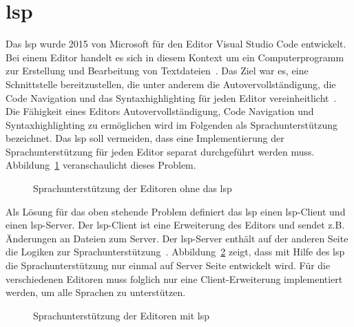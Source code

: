 \section{\acs{lsp}}

Das \ac{lsp} wurde 2015 von Microsoft für den Editor Visual Studio Code entwickelt.
Bei einem Editor handelt es sich in diesem Kontext um ein Computerprogramm zur Erstellung und Bearbeitung von Textdateien~\cite{editor-definition}.
Das Ziel war es, eine Schnittstelle bereitzustellen, die unter anderem die Autovervollständigung, die Code Navigation und das Syntaxhighlighting
für jeden Editor vereinheitlicht~\cite{lsp-witekio}.
Die Fähigkeit eines Editors Autovervollständigung, Code Navigation und Syntaxhighlighting zu ermöglichen wird im Folgenden als Sprachunterstützung bezeichnet.
Das \ac{lsp} soll vermeiden, dass eine Implementierung der Sprachunterstützung für jeden Editor separat durchgeführt werden muss.
Abbildung~\ref{fig:without-lsp} veranschaulicht dieses Problem.

\begin{figure}[htp] %
      \centering
      \caption{Sprachunterstützung der Editoren ohne das \acs{lsp}}
      \label{fig:without-lsp}
\end{figure}

Als Lösung für das oben stehende Problem definiert das \ac{lsp} einen \ac{lsp}-Client und einen \ac{lsp}-Server.
Der \ac{lsp}-Client ist eine Erweiterung des Editors und sendet z.B. Änderungen an Dateien zum Server.
Der \ac{lsp}-Server enthält auf der anderen Seite die Logiken zur Sprachunterstützung~\cite{lsp-witekio}.
Abbildung~\ref{fig:with-lsp} zeigt, dass mit Hilfe des \ac{lsp} die Sprachunterstützung nur einmal auf Server Seite entwickelt wird.
Für die verschiedenen Editoren muss folglich nur eine Client-Erweiterung implementiert werden, um alle Sprachen zu unterstützen.

\begin{figure}[htp] %
      \centering
      \caption{Sprachunterstützung der Editoren mit \acs{lsp}}
      \label{fig:with-lsp}
\end{figure}

